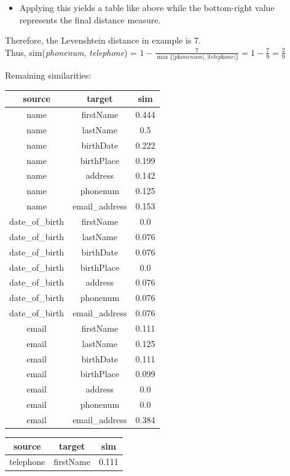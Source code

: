 \documentclass{scrartcl}
\begin{document}
\begin{enumerate}
\begin{itemize}
			\item Applying this yields a table like above while the bottom-right value represents the final distance measure.
		\end{itemize}
		Therefore, the Levenshtein distance in example is 7.\\
		Thus, sim(\textit{phonenum}, \textit{telephone}) = $1-\frac{7}{\max\{|\textit{phonenum}|, |\textit{telephone}|\}}=1-\frac{7}{9}=\frac{2}{9}$
		
		Remaining similarities:
		\begin{center}
			\begin{tabular}{|c|c|c|}
				\hline
				source & target & sim\\
				\hline
				name & firstName & 0.444\\
				name & lastName & 0.5\\
				name & birthDate & 0.222\\
				name & birthPlace & 0.199\\
				name & address & 0.142\\
				name & phonenum & 0.125\\
				name & email\_address & 0.153\\
				date\_of\_birth & firstName & 0.0\\
				date\_of\_birth & lastName & 0.076\\
				date\_of\_birth & birthDate & 0.076\\
				date\_of\_birth & birthPlace & 0.0\\
				date\_of\_birth & address & 0.076\\
				date\_of\_birth & phonenum & 0.076\\
				date\_of\_birth & email\_address & 0.076\\
				email & firstName & 0.111\\
				email & lastName & 0.125\\
				email & birthDate & 0.111\\
				email & birthPlace & 0.099\\
				email & address & 0.0\\
				email & phonenum & 0.0\\
				email & email\_address & 0.384\\
				\hline
			\end{tabular}
			\hfill
			\begin{tabular}{|c|c|c|}
				\hline
				source & target & sim\\
				\hline
				telephone & firstName & 0.111\\

\end{tabular}
\end{center}
\end{enumerate}
\end{document}
